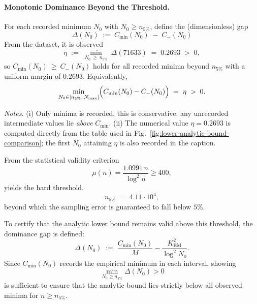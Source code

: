 \documentclass[11pt]{article}
\makeatletter
\theoremstyle{inline}
\theoremstyle{break}
\renewenvironment{proof}[1][\proofname]{%
  \par\pushQED{\qed}%
  \normalfont \topsep6\p@\@plus6\p@\relax
  \trivlist
  \item[\hskip\labelsep
        \itshape
    #1\@addpunct{.}]\mbox{}\\  %
}{%
  \popQED\endtrivlist\@endpefalse
}
\theoremstyle{break}
\theoremstyle{break}
\theoremstyle{break}
\theoremstyle{break}
\theoremstyle{break}
\theoremstyle{break}
\theoremstyle{inline}
\newcommand{\xNzeroStat}{71633} %
\newcommand{\xEtaStat}{0.2693} %
\newcommand{\Cmeas}{C}              %
\newcommand{\CminusProduct}{C_{-}}
\newcommand{\Kem}{K_{\mathrm{EM}}}              %
\makeatother
\begin{document}
\begin{proof}
\paragraph{Monotonic Dominance Beyond the Threshold.}
For each recorded minimum \(N_0\) with \(N_0\ge n_{5\%}\), define the (dimensionless) gap
\begin{equation}
\Delta(N_0)\;:=\;\Cmeas_{\min}(N_0)\;-\;\CminusProduct(N_0)
\end{equation}
From the dataset, it is observed
\begin{equation}
\eta\;:=\;\min_{N_0\ \ge\ n_{5\%}}\ \Delta(\xNzeroStat)\;=\;\xEtaStat\;>\;0,
\end{equation}
so \(\Cmeas_{\min}(N_0)\ \ge\ \CminusProduct(N_0)\) holds for all recorded minima beyond \(n_{5\%}\) with a uniform margin of \(\xEtaStat\).
Equivalently,
\begin{equation}
\min_{N_0\in[n_{5\%},\,N_{\max}]}\Bigl(\Cmeas_{\min}(N_0)-\CminusProduct(N_0)\Bigr) \;=\; \eta \;>\; 0.
\end{equation}

\noindent\emph{Notes.}
(i) Only minima is recorded, this is conservative: any unrecorded intermediate values lie \emph{above} \(\Cmeas_{\min}\).
(ii) The numerical value \(\eta=\xEtaStat\) is computed directly from the table used in Fig.~\ref{fig:lower-analytic-bound-comparison}; the first \(N_0\) attaining \(\eta\) is also recorded in the caption.

From the statistical validity criterion
\begin{equation}
\mu(n) = \frac{1.0991\,n}{\log^2 n} \ge 400,
\end{equation}
yields the hard threshold.
\begin{equation}
n_{5\%} \;=\; 4.11\cdot 10^4,
\end{equation}
beyond which the sampling error is guaranteed to fall below \( 5\% \).

To certify that the analytic lower bound remains valid above this threshold, the dominance gap is defined:
\begin{equation}
\Delta(N_0) \;:=\; \frac{\Cmeas_{\min}(N_0)}{M} - \frac{\Kem^2}{\log^2 N_0}.
\end{equation}
Since \( \Cmeas_{\min}(N_0) \) records the empirical minimum in each interval, showing
\begin{equation}
\min_{N_0 \ge n_{5\%}} \Delta(N_0) > 0
\end{equation}
is sufficient to ensure that the analytic bound lies strictly below all observed minima for \( n \ge n_{5\%} \).


\end{proof}
\end{document}
